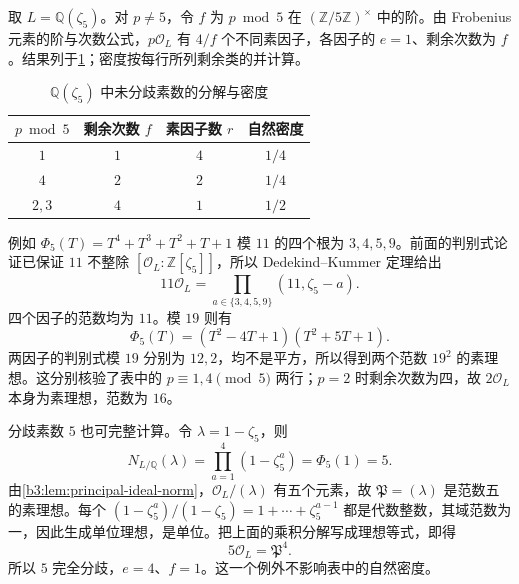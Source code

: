 \begin{example}\label{b3:exm:cyclotomic-five-frobenius}
	取 \(L=\mathbb Q(\zeta_5)\)。对 \(p\ne5\)，令 \(f\) 为 \(p\bmod5\) 在 \((\mathbb Z/5\mathbb Z)^\times\) 中的阶。由 Frobenius 元素的阶与次数公式，\(p\mathcal O_L\) 有 \(4/f\) 个不同素因子，各因子的 \(e=1\)、剩余次数为 \(f\)。结果列于\cref{b3:tab:cyclotomic-five-splitting-density}；密度按每行所列剩余类的并计算。
	\begin{table}[htbp]
		\centering
		\caption{\(\mathbb Q(\zeta_5)\) 中未分歧素数的分解与密度}
		\label{b3:tab:cyclotomic-five-splitting-density}
		\begin{tabular}{@{}cccc@{}}
			\toprule
			\(p\bmod5\) & 剩余次数 \(f\) & 素因子数 \(r\) & 自然密度 \\
			\midrule
			\(1\) & \(1\) & \(4\) & \(1/4\) \\
			\(4\) & \(2\) & \(2\) & \(1/4\) \\
			\(2,3\) & \(4\) & \(1\) & \(1/2\) \\
			\bottomrule
		\end{tabular}
	\end{table}

	例如 \(\Phi_5(T)=T^4+T^3+T^2+T+1\) 模 \(11\) 的四个根为 \(3,4,5,9\)。前面的判别式论证已保证 \(11\) 不整除 \([\mathcal O_L:\mathbb Z[\zeta_5]]\)，所以 Dedekind--Kummer 定理给出
	\[
		11\mathcal O_L=\prod_{a\in\{3,4,5,9\}}(11,\zeta_5-a).
	\]
	四个因子的范数均为 \(11\)。模 \(19\) 则有
	\[
		\Phi_5(T)=(T^2-4T+1)(T^2+5T+1).
	\]
	两因子的判别式模 \(19\) 分别为 \(12,2\)，均不是平方，所以得到两个范数 \(19^2\) 的素理想。这分别核验了表中的 \(p\equiv1,4\pmod5\) 两行；\(p=2\) 时剩余次数为四，故 \(2\mathcal O_L\) 本身为素理想，范数为 \(16\)。

	\ProseParagraphBreak
	分歧素数 \(5\) 也可完整计算。令 \(\lambda=1-\zeta_5\)，则
	\[
		N_{L/\mathbb Q}(\lambda)=\prod_{a=1}^4(1-\zeta_5^a)=\Phi_5(1)=5.
	\]
	由\cref{b3:lem:principal-ideal-norm}，\(\mathcal O_L/(\lambda)\) 有五个元素，故 \(\mathfrak P=(\lambda)\) 是范数五的素理想。每个 \((1-\zeta_5^a)/(1-\zeta_5)=1+\cdots+\zeta_5^{a-1}\) 都是代数整数，其域范数为一，因此生成单位理想，是单位。把上面的乘积分解写成理想等式，即得
	\[
		5\mathcal O_L=\mathfrak P^4.
	\]
	所以 \(5\) 完全分歧，\(e=4\)、\(f=1\)。这一个例外不影响表中的自然密度。
\end{example}

